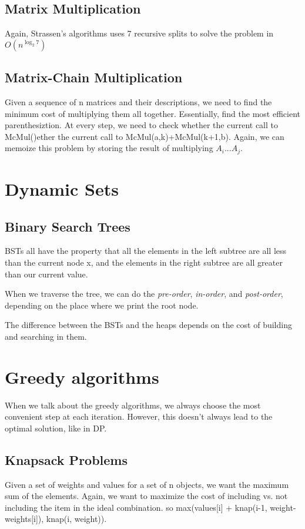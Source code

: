 \documentclass[portrait,10pt, a4paper]{article}
\begin{document}
\begin{multicols*}{3}
	\subsection{Matrix Multiplication}
		Again, Strassen's algorithms uses 7 recursive splits to solve the problem in $O(n^{\log_{2}7})$
	\subsection{Matrix-Chain Multiplication}	
		Given a sequence of n matrices and their descriptions, we need to find the minimum cost of multiplying them all together.
		Essentially, find the most efficient parenthesiztion. At every step, we need to check whether the current call to McMul()ether
		the current call to McMul(a,k)+McMul(k+1,b). Again, we can memoize this problem by storing the result of multiplying
		$A_{i}$...$A_{j}.$
\section{Dynamic Sets}
	\subsection{Binary Search Trees}
		BSTs all have the property that all the elements in the left subtree are all less than the current node x, and the elements
		in the right subtree are all greater than our current value. 

		When we traverse the tree, we can do the \textit{pre-order}, \textit{in-order}, and \textit{post-order}, depending 
		on the place where we print the root node.

		The difference between the BSTs and the heaps depends on the cost of building and searching in them.
\section{Greedy algorithms}
		When we talk about the greedy algorithms, we always choose the most convenient step at each iteration. However, 
		this doesn't always lead to the optimal solution, like in DP.

		\subsection{Knapsack Problems}
		Given a set of weights and values for a set of n objects, we want   the maximum sum of the elements.
		Again, we want to maximize the cost of including vs. not including the item in the ideal combination.
		so max(values[i] + knap(i-1, weight-weights[i]), knap(i, weight)).

\end{multicols*}
\end{document}
